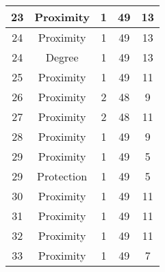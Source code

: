 \documentclass[results.tex]{subfiles}
\begin{document}
\begin{center}
\begin{tabular}{| c || c | c | c | c |}
            \hline
            23                      & Proximity                    & 1                      & 49                      & 13                   \\
            \hline
            24                      & Proximity                    & 1                      & 49                      & 13                   \\
            \hline
            24                      & Degree                       & 1                      & 49                      & 13                   \\
            \hline
            25                      & Proximity                    & 1                      & 49                      & 11                   \\
            \hline
            26                      & Proximity                    & 2                      & 48                      & 9                    \\
            \hline
            27                      & Proximity                    & 2                      & 48                      & 11                   \\
            \hline
            28                      & Proximity                    & 1                      & 49                      & 9                    \\
            \hline
            29                      & Proximity                    & 1                      & 49                      & 5                    \\
            \hline
            29                      & Protection                   & 1                      & 49                      & 5                    \\
            \hline
            30                      & Proximity                    & 1                      & 49                      & 11                   \\
            \hline
            31                      & Proximity                    & 1                      & 49                      & 11                   \\
            \hline
            32                      & Proximity                    & 1                      & 49                      & 11                   \\
            \hline
            33                      & Proximity                    & 1                      & 49                      & 7                    \\

\end{tabular}
\end{center}
\end{document}

